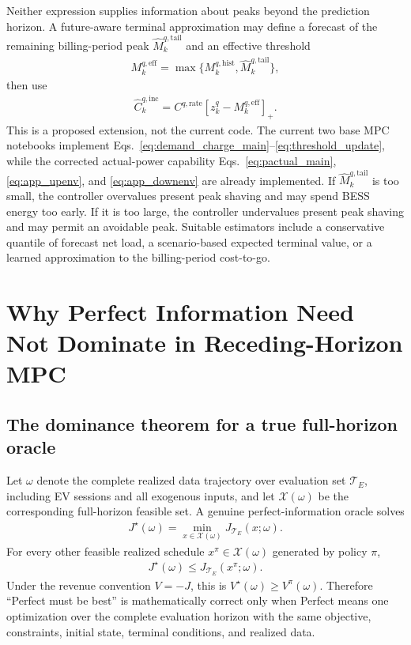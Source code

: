 \documentclass[final,5p,times]{elsarticle}
\newcommand{\calT}{\mathcal{T}}
\newcommand{\pos}[1]{\left[#1\right]_+}
\begin{document}
Neither expression supplies information about peaks beyond the prediction horizon. A future-aware terminal approximation may define a forecast of the remaining billing-period peak $\widehat M_{k}^{q,\mathrm{tail}}$ and an effective threshold
\begin{align}
M_k^{q,\mathrm{eff}}=\max\{M_k^{q,\mathrm{hist}},\widehat M_k^{q,\mathrm{tail}}\},
\label{eq:effective_threshold}
\end{align}
then use
\begin{align}
\widehat C_k^{q,\mathrm{inc}}=C^{q,\mathrm{rate}}\pos{z_k^q-M_k^{q,\mathrm{eff}}}.
\label{eq:future_aware_dc}
\end{align}
This is a proposed extension, not the current code. The current two base MPC notebooks implement Eqs.~\eqref{eq:demand_charge_main}--\eqref{eq:threshold_update}, while the corrected actual-power capability Eqs.~\eqref{eq:pactual_main}, \eqref{eq:app_upenv}, and \eqref{eq:app_downenv} are already implemented. If $\widehat M_k^{q,\mathrm{tail}}$ is too small, the controller overvalues present peak shaving and may spend BESS energy too early. If it is too large, the controller undervalues present peak shaving and may permit an avoidable peak. Suitable estimators include a conservative quantile of forecast net load, a scenario-based expected terminal value, or a learned approximation to the billing-period cost-to-go.

\section{Why Perfect Information Need Not Dominate in Receding-Horizon MPC}
\label{sec:perfect_non_dominance}

\subsection{The dominance theorem for a true full-horizon oracle}
Let $\omega$ denote the complete realized data trajectory over evaluation set $\calT_E$, including EV sessions and all exogenous inputs, and let $\mathcal X(\omega)$ be the corresponding full-horizon feasible set. A genuine perfect-information oracle solves
\begin{align}
J^{\star}(\omega)=\min_{x\in\mathcal X(\omega)}J_{\calT_E}(x;\omega).
\label{eq:oracle_problem}
\end{align}
For every other feasible realized schedule $x^{\pi}\in\mathcal X(\omega)$ generated by policy $\pi$,
\begin{align}
J^{\star}(\omega)\le J_{\calT_E}(x^{\pi};\omega).
\label{eq:oracle_dominance}
\end{align}
Under the revenue convention $V=-J$, this is $V^{\star}(\omega)\ge V^{\pi}(\omega)$. Therefore ``Perfect must be best'' is mathematically correct only when Perfect means one optimization over the complete evaluation horizon with the same objective, constraints, initial state, terminal conditions, and realized data.
\end{document}
